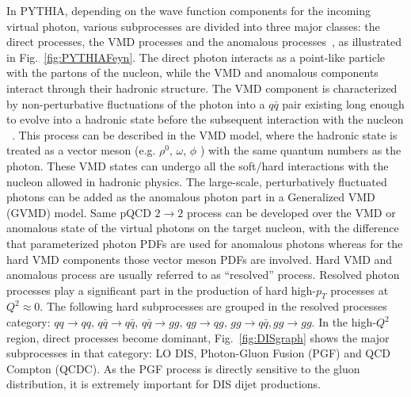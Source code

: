 In PYTHIA, depending on the wave function components for the incoming virtual
photon, various subprocesses are divided into three major classes: the direct
processes, the VMD processes and the anomalous processes~\cite{Friberg:2000ra},
as illustrated in Fig.~\ref{fig:PYTHIAFeyn}. The direct photon interacts as a
point-like particle with the partons of the nucleon, while the VMD and anomalous
components interact through their hadronic structure. The VMD component is
characterized by non-perturbative fluctuations of the photon into a $q\bar{q}$
pair existing long enough to evolve into a hadronic state before the subsequent
interaction with the nucleon ~\cite{Bauer:1977iq}. This process can be described
in the VMD model, where the hadronic state is treated as a vector meson (e.g.
$\rho^0$, $\omega$, $\phi$ ) with the same quantum numbers as the photon. These
VMD states can undergo all the soft/hard interactions with the nucleon allowed
in hadronic physics. The large-scale, perturbatively fluctuated photons can be
added as the anomalous photon part in a Generalized VMD (GVMD) model. Same pQCD
$2\rightarrow2$ process can be developed over the VMD or anomalous state of the
virtual photons on the target nucleon, with the difference that parameterized
photon PDFs are used for anomalous photons whereas for the hard VMD components
those vector meson PDFs are involved. Hard VMD and anomalous process are usually
referred to as ``resolved'' process. Resolved photon processes play a significant
part in the production of hard high-$p_{T}$ processes at $Q^{2}\approx0$. The
following hard subprocesses are grouped in the resolved processes category:
$qq\rightarrow qq, \, q\bar q \rightarrow q \bar q, \, q\bar q\rightarrow gg, \,
qg\rightarrow qg, \, gg\rightarrow q\bar q, gg\rightarrow gg$. In the
high-$Q^{2}$ region, direct processes become dominant, Fig.~\ref{fig:DISgraph}
shows the major subprocesses in that category: LO DIS, Photon-Gluon Fusion (PGF)
and QCD Compton (QCDC). As the PGF process is directly sensitive to the gluon
distribution, it is extremely important for DIS dijet productions. 


